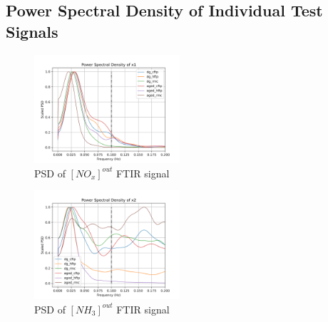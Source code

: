 \graphicspath{{Appendices/apx1_signal_est}}
\subsection{Power Spectral Density of Individual Test Signals}

\begin{multicols}{2}
       \begin{figure}[H]
        \centering
        \includegraphics[width=0.48\textwidth]{./figs/bfr_smth/test_psd/x1.png}
        \caption{PSD of $[NO_x]^{out}$ FTIR signal}
       \end{figure}

       \begin{figure}[H]
        \centering
        \includegraphics[width=0.48\textwidth]{./figs/bfr_smth/test_psd/x2.png}
        \caption{PSD of $[NH_3]^{out}$ FTIR signal}
       \end{figure}
\end{multicols}

